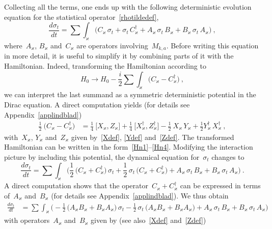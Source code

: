 \documentclass[reqno,11pt]{amsart}
\numberwithin{equation}{section}
\newcommand{\1}{\mathds{1}}
\newcommand{\sint}{\sum  \!\!\!\!\!\!\! \int }
\begin{document}
{Collecting all the terms, one ends up with
the following deterministic evolution equation for the statistical operator~\eqref{rhotildedef},
\[ \frac{d \sigma_t}{dt} = \sint_\varkappa \Big( C_\varkappa \,\sigma_t +  \sigma_t\, C_\varkappa^\dagger
+ A_\varkappa \,\sigma_t\, B_\varkappa + B_\varkappa \,\sigma_t\, A_\varkappa \Big) \:, \]
where~$A_\varkappa$, $B_\varkappa$ and~$C_\varkappa$ are operators involving~$M_{k,a}$.
Before writing this equation in more detail, it is useful to simplify it by
combining parts of it with the Hamiltonian. Indeed, transforming the Hamiltonian according to
\[ H_0 \rightarrow H_0 - \frac{i}{2} \sint_\varkappa \big( C_\varkappa - C_\varkappa^\dagger \big) \:, \]
we can interpret the last summand as a symmetric deterministic potential in the Dirac equation.
A direct computation yields (for details see Appendix~\ref{applindblad})
\begin{align*}
\frac{1}{2}\:\big( C_\varkappa - C_\varkappa^\dagger \big)
&= \frac{1}{4}\: \big[ X_\varkappa, Z_\varkappa \big] + \frac{1}{4}\: \big[ X_\varkappa^\dagger, Z_\varkappa^\dagger \big] 
-\frac{1}{2}\: X_\varkappa\, Y_\varkappa + \frac{1}{2} Y_\varkappa^\dagger\, X_\varkappa^\dagger \:,
\end{align*}
with~$X_\varkappa$, $Y_\varkappa$ and~$Z_\varkappa$ given by~\eqref{Xdef}, \eqref{Ydef} and~\eqref{Zdef}.
The transformed Hamiltonian can be written in the form~\eqref{Hn1}--\eqref{Hn4}.
Modifying the interaction picture by including this potential, the dynamical equation for~$\sigma_t$ changes to
\[ \frac{d \sigma_t}{dt} = \sint_\varkappa \Big( \frac{1}{2} \,\big( C_\varkappa + C_\varkappa^\dagger \big) \,\sigma_t
+ \frac{1}{2} \,\sigma_t\, \big(C_\varkappa + C_\varkappa^\dagger \big)
+ A_\varkappa \,\sigma_t\, B_\varkappa + B_\varkappa \,\sigma_t\, A_\varkappa \Big) \:. \]
A direct computation shows that the operator~$C_\varkappa + C_\varkappa^\dagger$ can be
expressed in terms of~$A_\varkappa$ and~$B_\varkappa$ (for details see Appendix~\ref{applindblad}).
We thus obtain
\begin{align*}
\frac{d \sigma_t}{dt} &= \sint_\varkappa \Big( -\frac{1}{2} \,\big( A_\varkappa B_\varkappa+ B_\varkappa A_\varkappa \big) \,\sigma_t
- \frac{1}{2} \,\sigma_t\, \big(A_\varkappa B_\varkappa+ B_\varkappa A_\varkappa \big)
+ A_\varkappa \,\sigma_t\, B_\varkappa + B_\varkappa \,\sigma_t\, A_\varkappa \Big)
\end{align*}
with operators~$A_\varkappa$ and~$B_\varkappa$ given by (see also~\eqref{Xdef} and~\eqref{Zdef})
\begin{align*}

\end{align*}}
\end{document}
